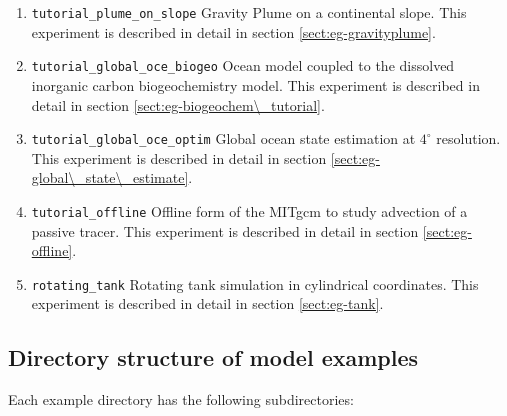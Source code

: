 \begin{enumerate}
\item \texttt{tutorial\_plume\_on\_slope} Gravity Plume on a continental slope.
  This experiment is described in detail in section \ref{sect:eg-gravityplume}.

\item \texttt{tutorial\_global\_oce\_biogeo} Ocean model coupled to the dissolved 
  inorganic carbon biogeochemistry model. This experiment is described in detail in section
  \ref{sect:eg-biogeochem\_tutorial}.

\item \texttt{tutorial\_global\_oce\_optim} Global ocean state estimation at $4^\circ$ resolution.
  This experiment is described in detail in section \ref{sect:eg-global\_state\_estimate}.

\item \texttt{tutorial\_offline} Offline form of the MITgcm to study advection of a passive 
  tracer.  This experiment is described in detail in section \ref{sect:eg-offline}.

\item \texttt{rotating\_tank} Rotating tank simulation in cylindrical coordinates.
  This experiment is described in detail in section \ref{sect:eg-tank}.

\end{enumerate}

\subsection{Directory structure of model examples}

Each example directory has the following subdirectories:


